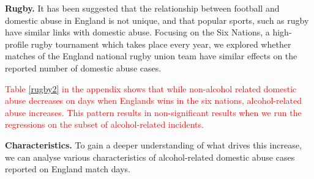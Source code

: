 \documentclass[12pt, letterpaper]{article}
\begin{document}
\textbf{Rugby.} It has been suggested that the relationship between football and domestic abuse in England is not unique, and that popular sports, such as rugby have similar links with domestic abuse\autocite{Brooks-Hay2018}. Focusing on the Six Nations, a high-profile rugby tournament which takes place every year, we explored whether matches of the England national rugby union team have similar effects on the reported number of domestic abuse cases. 


\textcolor{red}{Table \ref{rugby2} in the appendix shows that while non-alcohol related domestic abuse decreases on days when Englands wins in the six nations, alcohol-related abuse increases. This pattern results in non-significant results when we run the regressions on the subset of alcohol-related incidents.}

\textbf{Characteristics.} To gain a deeper understanding of what drives this increase, we can analyse various characteristics of alcohol-related domestic abuse cases reported on England match days. 




\end{document}

